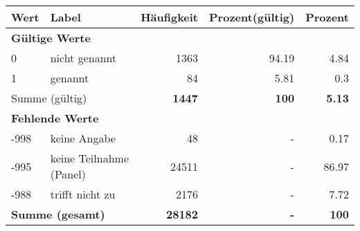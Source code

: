      \begin{longtable}{lXrrr}
     \toprule
     \textbf{Wert} & \textbf{Label} & \textbf{Häufigkeit} & \textbf{Prozent(gültig)} & \textbf{Prozent} \\
     \endhead
     \midrule
     \multicolumn{5}{l}{\textbf{Gültige Werte}}\\

     0 &
     \multicolumn{1}{X}{ nicht genannt   } &


       \num{1363} &
       \num[round-mode=places,round-precision=2]{94,19} &
         \num[round-mode=places,round-precision=2]{4,84} \\

     1 &
     \multicolumn{1}{X}{ genannt   } &


       \num{84} &
       \num[round-mode=places,round-precision=2]{5,81} &
         \num[round-mode=places,round-precision=2]{0,3} \\
     \midrule
     \multicolumn{2}{l}{Summe (gültig)} &
       \textbf{\num{1447}} &
     \textbf{100} &
       \textbf{\num[round-mode=places,round-precision=2]{5,13}} \\
     \multicolumn{5}{l}{\textbf{Fehlende Werte}}\\
       -998 &
       keine Angabe &
         \num{48} &
        - &
         \num[round-mode=places,round-precision=2]{0,17} \\
       -995 &
       keine Teilnahme (Panel) &
         \num{24511} &
        - &
         \num[round-mode=places,round-precision=2]{86,97} \\
       -988 &
       trifft nicht zu &
         \num{2176} &
        - &
         \num[round-mode=places,round-precision=2]{7,72} \\
     \midrule
     \multicolumn{2}{l}{\textbf{Summe (gesamt)}} &
          \textbf{\num{28182}} &
        \textbf{-} &
        \textbf{100} \\
     \bottomrule
     \end{longtable}
     
